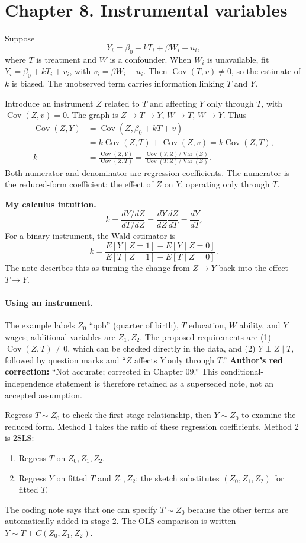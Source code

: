 \section{Chapter 8. Instrumental variables}
Suppose
\[Y_i=\beta_0+kT_i+\beta W_i+u_i,\]
where $T$ is treatment and $W$ is a confounder. When $W_i$ is unavailable, fit $Y_i=\beta_0+kT_i+v_i$, with $v_i=\beta W_i+u_i$. Then $\operatorname{Cov}(T,v)\ne0$, so the estimate of $k$ is biased. The unobserved term carries information linking $T$ and $Y$.

Introduce an instrument $Z$ related to $T$ and affecting $Y$ only through $T$, with $\operatorname{Cov}(Z,v)=0$. The graph is $Z\to T\to Y$, $W\to T$, $W\to Y$. Thus
\begin{align*}
\operatorname{Cov}(Z,Y)&=\operatorname{Cov}(Z,\beta_0+kT+v)\\
&=k\operatorname{Cov}(Z,T)+\operatorname{Cov}(Z,v)=k\operatorname{Cov}(Z,T),\\
k&=\frac{\operatorname{Cov}(Z,Y)}{\operatorname{Cov}(Z,T)}
=\frac{\operatorname{Cov}(Y,Z)/\operatorname{Var}(Z)}{\operatorname{Cov}(T,Z)/\operatorname{Var}(Z)}.
\end{align*}
Both numerator and denominator are regression coefficients. The numerator is the reduced-form coefficient: the effect of $Z$ on $Y$, operating only through $T$.

\textbf{My calculus intuition.}
\[k=\frac{dY/dZ}{dT/dZ}=\frac{dY}{dZ}\frac{dZ}{dT}=\frac{dY}{dT}.\]
For a binary instrument, the Wald estimator is
\[k=\frac{E[Y\mid Z=1]-E[Y\mid Z=0]}{E[T\mid Z=1]-E[T\mid Z=0]}.\]
The note describes this as turning the change from $Z\to Y$ back into the effect $T\to Y$.

\paragraph{Using an instrument.}
The example labels $Z_0$ ``qob'' (quarter of birth), $T$ education, $W$ ability, and $Y$ wages; additional variables are $Z_1,Z_2$. The proposed requirements are (1) $\operatorname{Cov}(Z,T)\ne0$, which can be checked directly in the data, and (2) $Y\perp Z\mid T$, followed by question marks and ``$Z$ affects $Y$ only through $T$.'' \textbf{Author's red correction:} ``Not accurate; corrected in Chapter 09.'' This conditional-independence statement is therefore retained as a superseded note, not an accepted assumption.

Regress $T\sim Z_0$ to check the first-stage relationship, then $Y\sim Z_0$ to examine the reduced form. Method 1 takes the ratio of these regression coefficients. Method 2 is 2SLS:
\begin{enumerate}
\item Regress $T$ on $Z_0,Z_1,Z_2$.
\item Regress $Y$ on fitted $T$ and $Z_1,Z_2$; the sketch substitutes $(Z_0,Z_1,Z_2)$ for fitted $T$.
\end{enumerate}
The coding note says that one can specify $T\sim Z_0$ because the other terms are automatically added in stage 2. The OLS comparison is written $Y\sim T+C(Z_0,Z_1,Z_2)$.

